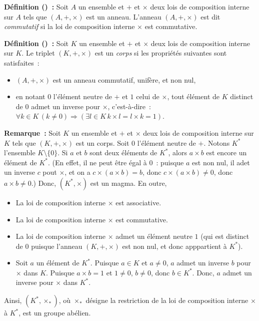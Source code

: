 \medskip

\noindent\textbf{Définition () :} Soit $A$ un ensemble et $+$ et $\times$ deux lois de composition interne sur $A$ tels que $(A, +, \times)$ est un anneau. 
    L'anneau $(A, +, \times)$ est dit \textit{commutatif} si la loi de composition interne $\times$ est commutative.

\medskip

\noindent\textbf{Définition () :} Soit $K$ un ensemble et $+$ et $\times$ deux lois de composition interne sur $K$. 
    Le triplet $(K, +, \times)$ est un \textit{corps} si les propriétés suivantes sont satisfaites : 
    \begin{itemize}[nosep]
        \item $(A,+,\times)$ est un anneau commutatif, unifère, et non nul,
        \item en notant $0$ l'élément neutre de $+$ et $1$ celui de $\times$, tout élément de $K$ distinct de $0$ admet un inverse pour $\times$, c'est-à-dire : $\forall k \in K \, (k \neq 0) \Rightarrow (\exists l \in K \, k \times l = l \times k = 1)$.
    \end{itemize}

\medskip

\noindent\textbf{Remarque :} Soit $K$ un ensemble et $+$ et $\times$ deux lois de composition interne sur $K$ tels que $(K, +, \times)$ est un corps. 
    Soit $0$ l'élément neutre de $+$.
    Notons $K^*$ l'ensemble $K \setminus \lbrace 0 \rbrace$.
    Si $a$ et $b$ sont deux éléments de $K^*$, alors $a \times b$ est encore un élément de $K^*$. 
    (En effet, il ne peut être égal à $0$ : puisque $a$ est non nul, il adet un inverse $c$ pout $\times$, et on a $c \times (a \times b) = b$, donc $c \times (a \times b) \neq 0$, donc $a \times b \neq 0$.)
    Donc, $(K^*, \times)$ est un magma.
    En outre, 
    \begin{itemize}[nosep]
        \item La loi de composition interne $\times$ est associative.
        \item La loi de composition interne $\times$ est commutative.
        \item La loi de composition interne $\times$ admet un élément neutre $1$ (qui est distinct de $0$ puisque l'anneau $(K, +, \times)$ est non nul, et donc apppartient à $K^*$).
        \item Soit $a$ un élément de $K^*$. 
            Puisque $a \in K$ et $a \neq 0$, $a$ admet un inverse $b$ pour $\times$ dans $K$.
            Puisque $a \times b = 1$ et $1 \neq 0$, $b \neq 0$, donc $b \in K^*$.
            Donc, $a$ admet un inverse pour $\times$ dans $K^*$.
    \end{itemize}
    Ainsi, $(K^*, \times_*)$, où $\times_*$ désigne la restriction de la loi de composition interne $\times$ à $K^*$, est un groupe abélien.

